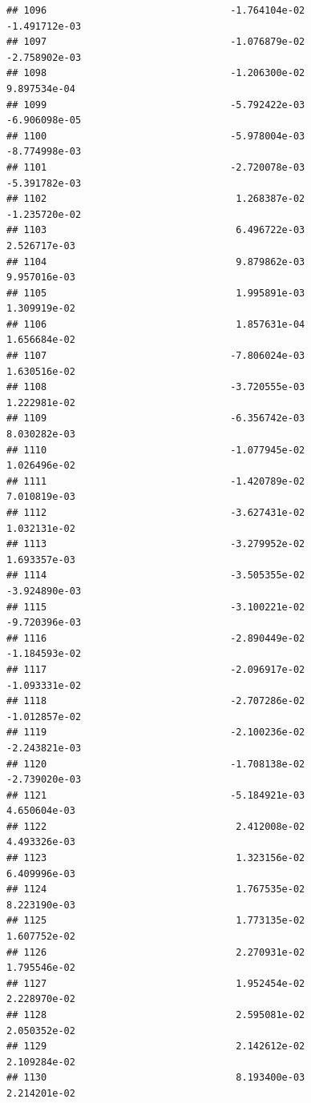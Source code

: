 \documentclass[
]{article}
\begin{document}
\begin{verbatim}
## 1096                                -1.764104e-02          -1.491712e-03
## 1097                                -1.076879e-02          -2.758902e-03
## 1098                                -1.206300e-02           9.897534e-04
## 1099                                -5.792422e-03          -6.906098e-05
## 1100                                -5.978004e-03          -8.774998e-03
## 1101                                -2.720078e-03          -5.391782e-03
## 1102                                 1.268387e-02          -1.235720e-02
## 1103                                 6.496722e-03           2.526717e-03
## 1104                                 9.879862e-03           9.957016e-03
## 1105                                 1.995891e-03           1.309919e-02
## 1106                                 1.857631e-04           1.656684e-02
## 1107                                -7.806024e-03           1.630516e-02
## 1108                                -3.720555e-03           1.222981e-02
## 1109                                -6.356742e-03           8.030282e-03
## 1110                                -1.077945e-02           1.026496e-02
## 1111                                -1.420789e-02           7.010819e-03
## 1112                                -3.627431e-02           1.032131e-02
## 1113                                -3.279952e-02           1.693357e-03
## 1114                                -3.505355e-02          -3.924890e-03
## 1115                                -3.100221e-02          -9.720396e-03
## 1116                                -2.890449e-02          -1.184593e-02
## 1117                                -2.096917e-02          -1.093331e-02
## 1118                                -2.707286e-02          -1.012857e-02
## 1119                                -2.100236e-02          -2.243821e-03
## 1120                                -1.708138e-02          -2.739020e-03
## 1121                                -5.184921e-03           4.650604e-03
## 1122                                 2.412008e-02           4.493326e-03
## 1123                                 1.323156e-02           6.409996e-03
## 1124                                 1.767535e-02           8.223190e-03
## 1125                                 1.773135e-02           1.607752e-02
## 1126                                 2.270931e-02           1.795546e-02
## 1127                                 1.952454e-02           2.228970e-02
## 1128                                 2.595081e-02           2.050352e-02
## 1129                                 2.142612e-02           2.109284e-02
## 1130                                 8.193400e-03           2.214201e-02

\end{verbatim}
\end{document}
